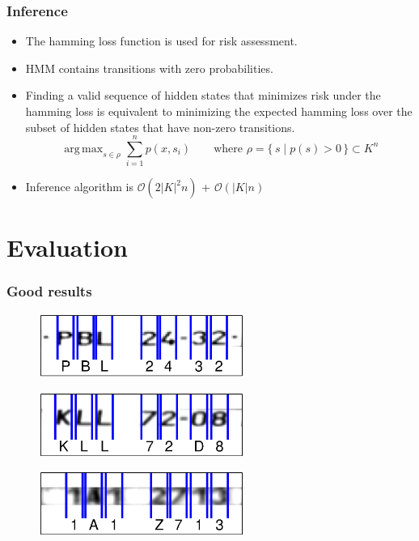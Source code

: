 \documentclass{beamer}
\DeclareMathOperator*{\argmax}{arg\,max}
\begin{document}
\begin{frame}
  \frametitle{Inference}
\begin{itemize}
\item  The hamming loss function is used for risk assessment.
\item HMM contains transitions with zero probabilities. 
\item  Finding a valid sequence of hidden states that minimizes risk
under the hamming loss is equivalent to minimizing the expected
hamming loss over the subset of hidden states that have non-zero
transitions.  
\[ 
\argmax_{s \in \rho} \sum_{i=1}^n p(x,s_i) \qquad \text{where } \rho =
       \{\, s \mid p(s) > 0 \,\} \subset K^n
\]
\item Inference algorithm is $\mathcal{O}(2|K|^2n)$ + $\mathcal{O}(|K|n)$
\end{itemize}
  
\end{frame}

\section{Evaluation}
\begin{frame}
  \frametitle{Good results}

\begin{figure}
  \centering
  \includegraphics[width=0.6\textwidth]{pics/lic_PBL2432.eps}          
\end{figure}  
  
\begin{figure}
  \centering
  \includegraphics[width=0.6\textwidth]{pics/lic_KLL72D8.eps}
\end{figure}  

\begin{figure}
  \centering
  \includegraphics[width=0.6\textwidth]{pics/lic_1A1Z713.eps}
\end{figure}    
  
\end{frame}
\end{document}
